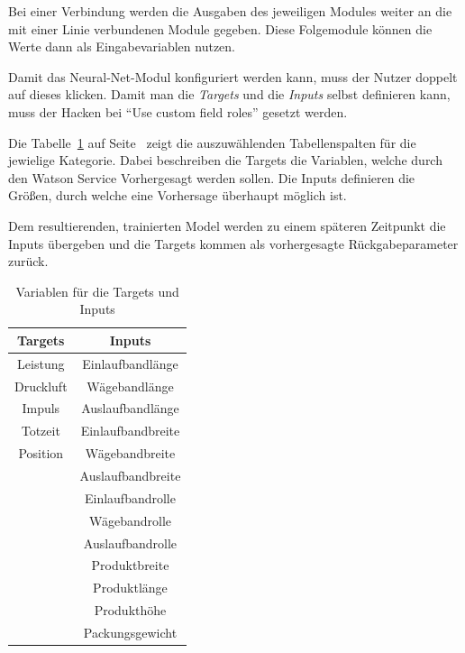 Bei einer Verbindung werden die Ausgaben des jeweiligen Modules weiter an die mit einer Linie verbundenen Module
gegeben. Diese Folgemodule können die Werte dann als Eingabevariablen nutzen.

Damit das Neural-Net-Modul konfiguriert werden kann, muss der Nutzer doppelt auf dieses klicken. Damit man die
\textit{Targets} und die \textit{Inputs} selbst definieren kann, muss der Hacken bei \enquote{Use custom field roles}
gesetzt werden.

Die Tabelle~\ref{tab:targets_inputs} auf Seite~\pageref{tab:targets_inputs} zeigt die auszuwählenden Tabellenspalten für
die jewielige Kategorie. Dabei beschreiben die Targets die Variablen, welche durch den Watson Service Vorhergesagt werden
sollen. Die Inputs definieren die Größen, durch welche eine Vorhersage überhaupt möglich ist.

Dem resultierenden, trainierten Model werden zu einem späteren Zeitpunkt die Inputs übergeben und die Targets kommen als
vorhergesagte Rückgabeparameter zurück.

\begin{table}[hb]
    \centering
    \begin{tabular}{|c|c|}
        \hline
        \textbf{Targets} & \textbf{Inputs}\\
        \hline
        \hline
        Leistung & Einlaufbandlänge\\
        \hline
        Druckluft & Wägebandlänge\\
        \hline
        Impuls & Auslaufbandlänge\\
        \hline
        Totzeit & Einlaufbandbreite\\
        \hline
        Position & Wägebandbreite\\
        \hline
        & Auslaufbandbreite\\
        \hline
        & Einlaufbandrolle\\
        \hline
        & Wägebandrolle\\
        \hline
        & Auslaufbandrolle\\
        \hline
        & Produktbreite\\
        \hline
        & Produktlänge\\
        \hline
        & Produkthöhe\\
        \hline
        & Packungsgewicht\\
        \hline
    \end{tabular}
    \caption{Variablen für die Targets und Inputs}
    \label{tab:targets_inputs}
\end{table}

